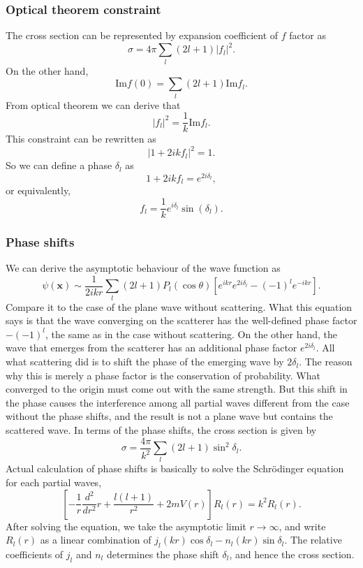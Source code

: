 \subsubsection{Optical theorem constraint}
\noindent
The cross section can be represented by expansion coefficient of $f$ factor as
\[\sigma = 4\pi \sum_l (2l+1)|f_l|^2.\]
On the other hand, 
\[\mathrm{Im} f(0) = \sum_l (2l+1) \mathrm{Im} f_l.\]
From optical theorem we can derive that
\[|f_l|^2 = \frac{1}{k} \mathrm{Im} f_l.\]
This constraint can be rewritten as
\[|1+2ikf_l|^2 = 1.\]
So we can define a phase $\delta_l$ as 
\[1+2ikf_l = e^{2i\delta_l},\]
or equivalently,
\[f_l = \frac{1}{k} e^{i\delta_l} \sin(\delta_l).\]

\subsubsection{Phase shifts}
\noindent
We can derive the asymptotic behaviour of the wave function as
\[\psi(\bm{x}) \sim \frac{1}{2ikr} \sum_{l} (2l+1)P_l(\cos \theta) [e^{ikr}e^{2i\delta_l} - (-1)^l e^{-ikr}].\]
Compare it to the case of the plane wave without scattering. What this equation says is that the wave converging on the scatterer
has the well-defined phase factor $-(-1)^l$, the same as in the case without scattering. On the other hand, the wave that emerges from the scatterer has an additional phase factor $e^{2i\delta_l}$. All what scattering did is to shift the phase of the emerging wave by $2\delta_l$. The reason why this is merely a phase factor is
the conservation of probability. What converged to the origin must come out with the same strength. But this shift in the phase causes the interference among all partial waves different from the case without the phase shifts, and the result is not a plane wave but contains the scattered wave.
In terms of the phase shifts, the cross section is given by
\[\sigma = \frac{4\pi}{k^2} \sum_l (2l+1) \sin^2\delta_l.\]
Actual calculation of phase shifts is basically to solve the Schr\"{o}dinger equation for each partial waves,
\[\left[-\frac{1}{r}\frac{d^2}{dr^2}r+\frac{l(l+1)}{r^2}+2mV(r)\right]R_l(r) = k^2 R_l(r).\]
After solving the equation, we take the asymptotic limit $r \to \infty$, and write $R_l(r)$ as a linear combination of $j_l(kr)\cos \delta_l - n_l(kr) \sin \delta_l $. The relative coefficients of $j_l$ and $n_l$ determines the phase shift $\delta_l$, and hence the cross section.

